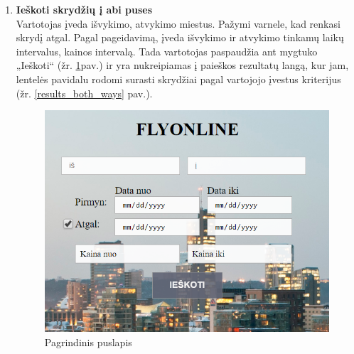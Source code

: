\documentclass{VUMIFPSkursinis}
\begin{document}
\begin{enumerate}[label=\textbf{U\arabic*}.]
                    \item \textbf{Ieškoti skrydžių į abi puses}\\
                    Vartotojas įveda išvykimo, atvykimo miestus. Pažymi varnele, kad renkasi skrydį atgal. Pagal pageidavimą, įveda išvykimo ir atvykimo tinkamų laikų intervalus, kainos intervalą. Tada vartotojas paspaudžia ant mygtuko „Ieškoti“ (žr. \ref{home_page_both_ways}pav.) ir yra nukreipiamas į paieškos rezultatų langą, kur jam, lentelės pavidalu rodomi surasti skrydžiai pagal vartojojo įvestus kriterijus (žr. \ref{results_both_ways} pav.).
                    \begin{figure}[H]
                        \centering
                        \includegraphics[scale=0.8]{img/bothways}
                        \caption{Pagrindinis puslapis}
                        \label{home_page_both_ways}
                    \end{figure}
    

\end{enumerate}
\end{document}
